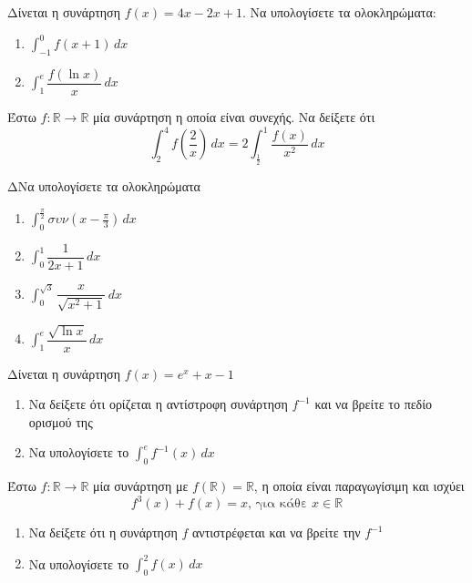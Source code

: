 \documentclass{presentation}
\begin{document}
\begin{askisi}
  Δίνεται η συνάρτηση $f(x)=4x-2x+1$. Να υπολογίσετε τα ολοκληρώματα:
  \begin{enumerate}
    \item<1-> $\int_{-1}^{0} f(x+1) \,dx$
    \item<2-> $\int_{1}^{e} \dfrac{f(\ln x)}{x} \,dx$
  \end{enumerate}

\end{askisi}

\begin{askisi}
  Έστω $f:\mathbb{R}\to\mathbb{R}$ μία συνάρτηση η οποία είναι συνεχής. Να δείξετε ότι
  $$\int_{2}^{4} f\left( \dfrac{2}{x} \right)  \,dx=2\int_{\frac{1}{2}}^{1} \dfrac{f(x)}{x^2} \,dx$$

\end{askisi}

\begin{askisi}
  ΔΝα υπολογίσετε τα ολοκληρώματα
  \begin{enumerate}
    \item<1-> $\int_{0}^{\frac{π}{2}} συν(x-\frac{π}{3}) \,dx$
    \item<2-> $\int_{0}^{1} \dfrac{1}{2x+1} \,dx$
    \item<3-> $\int_{0}^{\sqrt{3}} \dfrac{x}{\sqrt{x^2+1}} \,dx$
    \item<4-> $\int_{1}^{e} \dfrac{\sqrt{\ln x}}{x} \,dx$
  \end{enumerate}

\end{askisi}

\begin{askisi}
  Δίνεται η συνάρτηση $f(x)=e^x+x-1$
  \begin{enumerate}
    \item<1-> Να δείξετε ότι ορίζεται η αντίστροφη συνάρτηση $f^{-1}$ και να βρείτε το πεδίο ορισμού της
    \item<2-> Να υπολογίσετε το $\int_{0}^{e} f^{-1}(x) \,dx$
  \end{enumerate}

\end{askisi}

\begin{askisi}
  Έστω $f:\mathbb{R}\to\mathbb{R}$ μία συνάρτηση με $f(\mathbb{R})=\mathbb{R}$, η οποία είναι παραγωγίσιμη και ισχύει
  $$f^3(x)+f(x)=x \text{, για κάθε } x\in\mathbb{R}$$
  \begin{enumerate}
    \item<1-> Να δείξετε ότι η συνάρτηση $f$ αντιστρέφεται και να βρείτε την $f^{-1}$
    \item<2-> Να υπολογίσετε το $\int_{0}^{2} f(x) \,dx$
  \end{enumerate}

\end{askisi}
\end{document}
